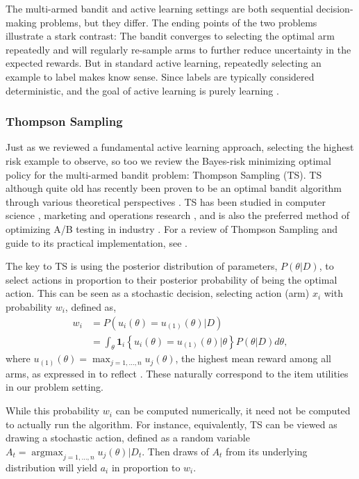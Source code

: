 \documentclass[nonblindrev]{informs3}
\begin{document}
The multi-armed bandit and active learning settings are both sequential decision-making problems, but they differ. The ending points of the two problems illustrate a stark contrast: The bandit converges to selecting the optimal arm repeatedly and will regularly re-sample arms to further reduce uncertainty in the expected rewards. But in standard active learning, repeatedly selecting an example to label makes know sense. Since labels are typically considered deterministic, and the goal of active learning is purely learning \citep{gantigray2013bridgealmab}. 



\subsubsection{Thompson Sampling}

Just as we reviewed a fundamental active learning approach, selecting the highest risk example to observe, so too we review the Bayes-risk minimizing optimal policy for the multi-armed bandit problem: Thompson Sampling (TS). TS although quite old \citep{thompson1933likelihood} has recently been proven to be an optimal bandit algorithm through various theoretical perspectives \citep{KaufmannEtAl2012,OrtegaBraun2013,RussoVanRoy2015}. TS has been studied in computer science \citep{ChapelleLi2011}, marketing \citep{schwartzetal2017} and operations research \citep{RussoVanRoy2014}, and is also the preferred method of optimizing A/B testing in industry \citep{Scott2010,scott2015multi}. For a review of Thompson Sampling and guide to its practical implementation, see \cite{russo2017tutorial}. 

The key to TS is using the posterior distribution of parameters, $P(\theta|D)$, to select actions in proportion to their posterior probability of being the optimal action. This can be seen as a stochastic decision, selecting action (arm) $x_i$ with probability $w_i$, defined as,
\begin{align} 
w_i &= P(u_i(\theta) = u_{(1)}(\theta) | D ) \\
&= \int_\theta \mathbf{1}_i\left\{ u_i(\theta) = u_{(1)}(\theta)| \theta \right\} P(\theta|D)d\theta ,
\end{align}
where $u_{(1)}(\theta)=\max_{j=1,\ldots,n} u_j(\theta)$, the highest mean reward among all arms, as expressed in \cite{Scott2010} to reflect \cite{thompson1933likelihood}. These naturally correspond to the item utilities in our problem setting.

While this probability $w_i$ can be computed numerically, it need not be computed to actually run the algorithm. For instance, equivalently, TS can be viewed as drawing a stochastic action, defined as a random variable $A_t = \mathop{\text{arg}\max}_{j=1,\ldots,n} u_{j}(\theta) | D_t$. Then draws of $A_t$ from its underlying distribution will yield $a_i$ in proportion to $w_i$.
\end{document}
